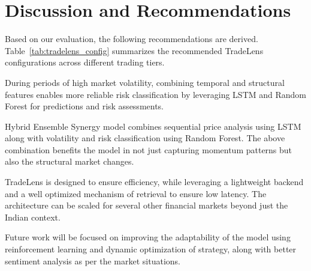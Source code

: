 \documentclass[twocolumn]{article}
\begin{document}
\section{Discussion and Recommendations}

Based on our evaluation, the following recommendations are derived. Table~\ref{tab:tradelens_config} summarizes the recommended TradeLens configurations across different trading tiers.

\begin{table}[!t]
\centering
\caption{Recommended TradeLens Configurations for Different Market Segments}
\label{tab:tradelens_config}

\end{table}

During periods of high market volatility, combining temporal and structural features enables more reliable risk classification by leveraging LSTM and Random Forest for predictions and risk assessments.

Hybrid Ensemble Synergy model combines sequential price analysis using LSTM along with volatility and risk classification using Random Forest. The above combination benefits the model in not just capturing momentum patterns but also the structural market changes.

TradeLens is designed to ensure efficiency, while leveraging a lightweight backend and a well optimized mechanism of retrieval to ensure low latency. The architecture can be scaled for several other financial markets beyond just the Indian context.

Future work will be focused on improving the adaptability of the model using reinforcement learning and dynamic optimization of strategy, along with better sentiment analysis as per the market situations.

\end{document}
